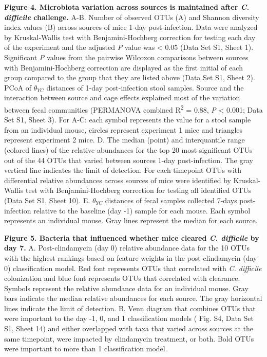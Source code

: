 \documentclass[
  11pt,
]{article}
\begin{document}
\textbf{Figure 4. Microbiota variation across sources is maintained
after \emph{C. difficile} challenge.} A-B. Number of observed OTUs (A)
and Shannon diversity index values (B) across sources of mice 1-day
post-infection. Data were analyzed by Kruskal-Wallis test with
Benjamini-Hochberg correction for testing each day of the experiment and
the adjusted \emph{P} value was \textless{} 0.05 (Data Set S1, Sheet 1).
Significant \emph{P} values from the pairwise Wilcoxon comparisons
between sources with Benjamini-Hochberg correction are displayed as the
first initial of each group compared to the group that they are listed
above (Data Set S1, Sheet 2). PCoA of \(\theta_{YC}\) distances of 1-day
post-infection stool samples. Source and the interaction between source
and cage effects explained most of the variation between fecal
communities (PERMANOVA combined R\textsuperscript{2} = 0.88, \emph{P}
\textless{} 0.001; Data Set S1, Sheet 3). For A-C: each symbol
represents the value for a stool sample from an individual mouse,
circles represent experiment 1 mice and triangles represent experiment 2
mice. D. The median (point) and interquantile range (colored lines) of
the relative abundances for the top 20 most significant OTUs out of the
44 OTUs that varied between sources 1-day post-infection. The gray
vertical line indicates the limit of detection. For each timepoint OTUs
with differential relative abundances across sources of mice were
identified by Kruskal-Wallis test with Benjamini-Hochberg correction for
testing all identified OTUs (Data Set S1, Sheet 10). E. \(\theta_{YC}\)
distances of fecal samples collected 7-days post-infection relative to
the baseline (day -1) sample for each mouse. Each symbol represents an
individual mouse. Gray lines represent the median for each source.

\newpage

\textbf{Figure 5. Bacteria that influenced whether mice cleared \emph{C.
difficile} by day 7.} A. Post-clindamycin (day 0) relative abundance
data for the 10 OTUs with the highest rankings based on feature weights
in the post-clindamycin (day 0) classification model. Red font
represents OTUs that correlated with \emph{C. difficile} colonization
and blue font represents OTUs that correlated with clearance. Symbols
represent the relative abundance data for an individual mouse. Gray bars
indicate the median relative abundances for each source. The gray
horizontal lines indicate the limit of detection. B. Venn diagram that
combines OTUs that were important to the day -1, 0, and 1 classification
models ( Fig. S4, Data Set S1, Sheet 14) and either overlapped with taxa
that varied across sources at the same timepoint, were impacted by
clindamycin treatment, or both. Bold OTUs were important to more than 1
classification model.
\end{document}

